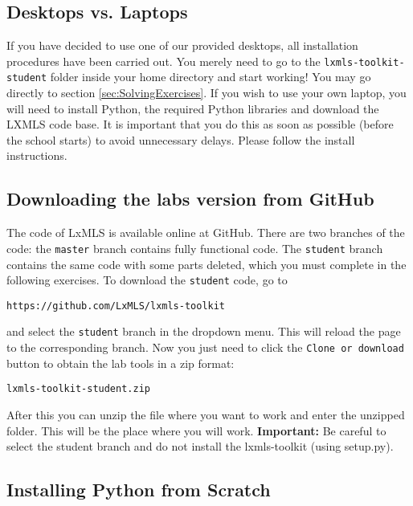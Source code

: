 \subsection{Desktops vs. Laptops}

If you have decided to use one of our provided desktops, all installation procedures have been carried out. You merely need to go to the \verb+lxmls-toolkit-student+ folder inside your home directory and start working! You may go directly to section \ref{sec:SolvingExercises}. If you wish to use your own laptop, you will need to install Python, the required Python libraries and download the LXMLS code base. It is important that you do this as soon as possible (before the school starts) to avoid unnecessary delays. Please follow the install instructions. 

\subsection{Downloading the labs version from GitHub}

The code of LxMLS is available online at GitHub. There are two branches of the code: the \verb+master+ branch contains fully functional code. The \verb+student+ branch contains the same code with some parts deleted, which you must complete in the following exercises. To download the \verb+student+ code, go to

\begin{verbatim}
https://github.com/LxMLS/lxmls-toolkit
\end{verbatim}

\noindent and select the \verb+student+ branch in the dropdown menu. This will reload the page to the corresponding branch. Now you just need to click the \verb+Clone or download + button to obtain the lab tools in a zip format:

\begin{verbatim}
lxmls-toolkit-student.zip
\end{verbatim}

After this you can unzip the file where you want to work and enter the unzipped folder. This will be the place where you will work. \textbf{Important:} Be careful to select the student branch and do not install the lxmls-toolkit (using setup.py).

\subsection{Installing Python from Scratch}

